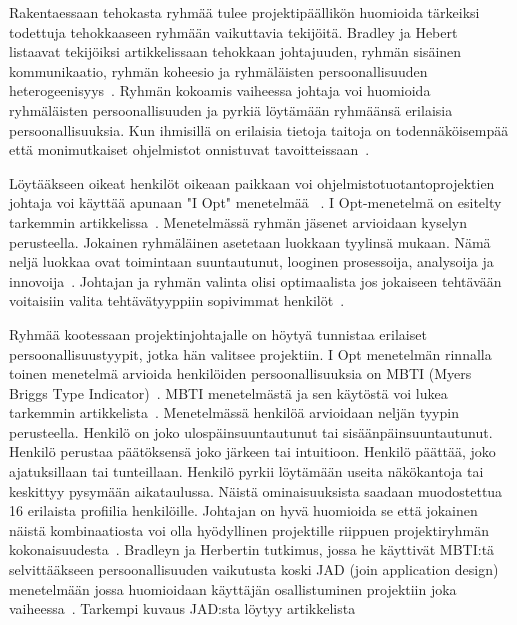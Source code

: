 \documentclass[finnish]{tktltiki2}
\theoremstyle{definition}
\theoremstyle{remark}
\begin{document}
Rakentaessaan tehokasta ryhmää tulee projektipäällikön huomioida tärkeiksi todettuja tehokkaaseen ryhmään vaikuttavia tekijöitä. Bradley ja Hebert listaavat tekijöiksi artikkelissaan tehokkaan johtajuuden, ryhmän sisäinen kommunikaatio, ryhmän koheesio ja ryhmäläisten persoonallisuuden heterogeenisyys~\cite{bradley1997effect}. Ryhmän kokoamis vaiheessa johtaja voi huomioida ryhmäläisten persoonallisuuden ja pyrkiä löytämään ryhmäänsä erilaisia persoonallisuuksia. Kun ihmisillä on erilaisia tietoja taitoja on todennäköisempää että monimutkaiset ohjelmistot onnistuvat tavoitteissaan~\cite{bradley1997effect}.

Löytääkseen oikeat henkilöt oikeaan paikkaan voi ohjelmistotuotantoprojektien johtaja voi käyttää apunaan "I Opt" menetelmää ~\cite{Dhomne:2012:ITL:2382887.2382899}. I Opt-menetelmä on esitelty tarkemmin artikkelissa~\cite{ kliem1996teambuilding}. Menetelmässä ryhmän jäsenet arvioidaan kyselyn perusteella. Jokainen ryhmäläinen asetetaan luokkaan tyylinsä mukaan. Nämä neljä luokkaa ovat toimintaan suuntautunut, looginen prosessoija, analysoija ja innovoija~\cite{ kliem1996teambuilding}. Johtajan ja ryhmän valinta olisi optimaalista jos jokaiseen tehtävään voitaisiin valita tehtävätyyppiin sopivimmat henkilöt~\cite{Dhomne:2012:ITL:2382887.2382899}.

Ryhmää kootessaan projektinjohtajalle on höytyä tunnistaa erilaiset persoonallisuustyypit, jotka hän valitsee projektiin. I Opt menetelmän rinnalla toinen menetelmä arvioida henkilöiden persoonallisuuksia on MBTI (Myers Briggs Type Indicator)~\cite{bradley1997effect}. MBTI menetelmästä ja sen käytöstä voi lukea tarkemmin artikkelista~\cite{myers1985manual}. Menetelmässä henkilöä arvioidaan neljän tyypin perusteella. Henkilö on joko ulospäinsuuntautunut tai sisäänpäinsuuntautunut. Henkilö perustaa päätöksensä joko järkeen tai intuitioon. Henkilö päättää, joko ajatuksillaan tai tunteillaan. Henkilö pyrkii löytämään useita näkökantoja tai keskittyy pysymään aikataulussa. Näistä ominaisuuksista saadaan muodostettua 16 erilaista profiilia henkilöille. Johtajan on hyvä huomioida se että jokainen näistä kombinaatiosta voi olla hyödyllinen projektille riippuen projektiryhmän kokonaisuudesta~\cite{bradley1997effect}. Bradleyn ja Herbertin tutkimus, jossa he käyttivät MBTI:tä selvittääkseen persoonallisuuden vaikutusta koski JAD (join application design) menetelmään jossa huomioidaan käyttäjän osallistuminen projektiin joka vaiheessa~\cite{bradley1997effect}. Tarkempi kuvaus JAD:sta löytyy artikkelista~\cite{Davidson1999215}
\end{document}

